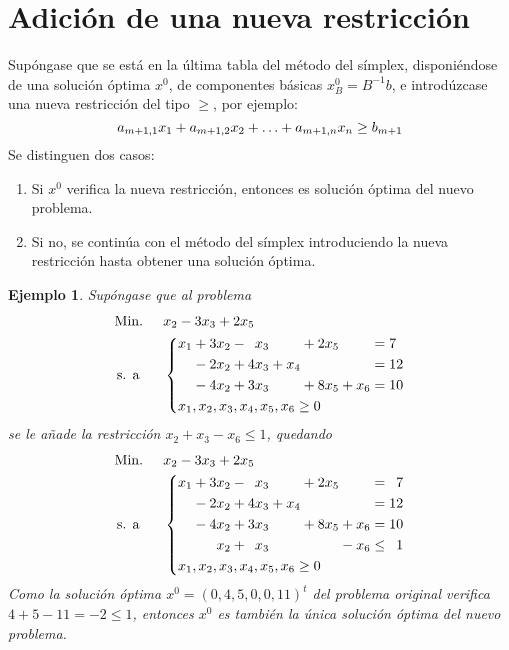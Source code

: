 \documentclass[11pt]{report}
\theoremstyle{mytheorem}
\theoremstyle{mydefinition}
\theoremstyle{myexample}
\newtheorem*{example}{Ejemplo}
\begin{document}
\section{Adición de una nueva restricción}

Supóngase que se está en la última tabla del método del símplex, disponiéndose de una solución óptima $x^0$, de componentes básicas $x^0_B = B^{-1}b$, e introdúzcase una nueva restricción del tipo $\geq$, por ejemplo:
\[a_{m+1,1}x_1+a_{m+1,2}x_2+\mathellipsis+a_{m+1,n}x_n \geq b_{m+1}\]
Se distinguen dos casos:
\begin{enumerate}
    \item Si $x^0$ verifica la nueva restricción, entonces es solución óptima del nuevo problema.
    \item Si no, se continúa con el método del símplex introduciendo la nueva restricción hasta obtener una solución óptima.
\end{enumerate}

\begin{example}
Supóngase que al problema
\[\begin{aligned}[t]
&\text{Min. } && x_2-3x_3+2x_5 \\
& \, \text{s. a} &&\left\{\begin{alignedat}{10}
& &x_1 & {}+{} & 3x_2 & {}-{} &  &x_3 &       &     & {}+{} & 2x_5 &       &     & {}={} & 7 \\
& &    & {}-{} & 2x_2 & {}+{} & 4&x_3 & {}+{} & x_4 &       &      &       &     & {}={} & 12 \\
& &    & {}-{} & 4x_2 & {}+{} & 3&x_3 &       &     & {}+{} & 8x_5 & {}+{} & x_6 & {}={} & 10 \\
&\mathrlap{x_1,x_2,x_3,x_4,x_5,x_6 \geq 0}
\end{alignedat}\right.
\end{aligned}\]
se le añade la restricción $x_2+x_3-x_6 \leq 1$, quedando
\[\begin{aligned}[t]
&\text{Min. } && x_2-3x_3+2x_5 \\
& \, \text{s. a} &&\left\{\begin{alignedat}{10}
& &x_1 & {}+{} & 3&x_2 & {}-{} &  &x_3 &       &     & {}+{} & 2x_5 &       &     & {}={} & 7 \\
& &    & {}-{} & 2&x_2 & {}+{} & 4&x_3 & {}+{} & x_4 &       &      &       &     & {}={} & 12 \\
& &    & {}-{} & 4&x_2 & {}+{} & 3&x_3 &       &     & {}+{} & 8x_5 & {}+{} & x_6 & {}={} & 10 \\
& &    &       &  &x_2 & {}+{} &  &x_3 &       &     &       &      & {}-{} & x_6 & {}\leq{} & 1 \\
&\mathrlap{x_1,x_2,x_3,x_4,x_5,x_6 \geq 0}
\end{alignedat}\right.
\end{aligned}\]
Como la solución óptima $x^0 = (0,4,5,0,0,11)^t$ del problema original verifica $4+5-11=-2 \leq 1$, entonces $x^0$ es también la única solución óptima del nuevo problema.
\end{example}
\end{document}
